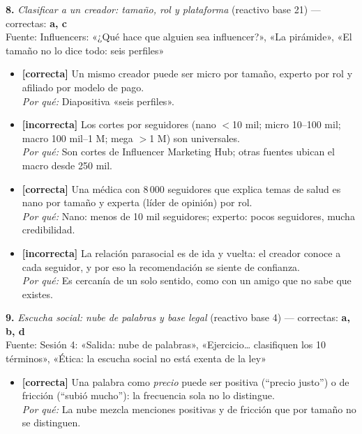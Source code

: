 \documentclass[10pt,letterpaper]{article}
\begin{document}
{\vspace{3pt}\noindent\textbf{8.} \textit{Clasificar a un creador: tamaño, rol y plataforma} (reactivo base 21) — correctas: \textbf{a, c}\\[-1pt]
{\scriptsize Fuente: Influencers: «¿Qué hace que alguien sea influencer?», «La pirámide», «El tamaño no lo dice todo: seis perfiles»}
\begin{itemize}[leftmargin=1.2em,itemsep=0pt,topsep=1pt,parsep=0pt]
\item[\textbf{a)}] {\footnotesize \textbf{[correcta]} Un mismo creador puede ser micro por tamaño, experto por rol y afiliado por modelo de pago.\\ \textit{Por qué:} Diapositiva «seis perfiles».}
\item[\textbf{b)}] {\footnotesize \textbf{[incorrecta]} Los cortes por seguidores (nano $<$10 mil; micro 10--100 mil; macro 100 mil--1 M; mega $>$1 M) son universales.\\ \textit{Por qué:} Son cortes de Influencer Marketing Hub; otras fuentes ubican el macro desde 250 mil.}
\item[\textbf{c)}] {\footnotesize \textbf{[correcta]} Una médica con 8\,000 seguidores que explica temas de salud es nano por tamaño y experta (líder de opinión) por rol.\\ \textit{Por qué:} Nano: menos de 10 mil seguidores; experto: pocos seguidores, mucha credibilidad.}
\item[\textbf{d)}] {\footnotesize \textbf{[incorrecta]} La relación parasocial es de ida y vuelta: el creador conoce a cada seguidor, y por eso la recomendación se siente de confianza.\\ \textit{Por qué:} Es cercanía de un solo sentido, como con un amigo que no sabe que existes.}
\end{itemize}
\vspace{3pt}\noindent\textbf{9.} \textit{Escucha social: nube de palabras y base legal} (reactivo base 4) — correctas: \textbf{a, b, d}\\[-1pt]
{\scriptsize Fuente: Sesión 4: «Salida: nube de palabras», «Ejercicio… clasifiquen los 10 términos», «Ética: la escucha social no está exenta de la ley»}
\begin{itemize}[leftmargin=1.2em,itemsep=0pt,topsep=1pt,parsep=0pt]
\item[\textbf{a)}] {\footnotesize \textbf{[correcta]} Una palabra como \textit{precio} puede ser positiva (\enquote{precio justo}) o de fricción (\enquote{subió mucho}): la frecuencia sola no lo distingue.\\ \textit{Por qué:} La nube mezcla menciones positivas y de fricción que por tamaño no se distinguen.}

\end{itemize}}
\end{document}
